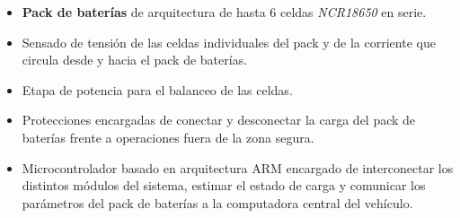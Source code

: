 \documentclass[10pt,a4paper]{article}
\begin{document}
\begin{itemize}
	\item \textbf{Pack de baterías} de arquitectura de hasta 6 celdas \emph{NCR18650} en serie.
	\item Sensado de tensión de las celdas individuales del pack y de la corriente que circula desde y hacia el pack de baterías.
	\item Etapa de potencia para el balanceo de las celdas.
	\item Protecciones encargadas de conectar y desconectar la carga del pack de baterías frente a operaciones fuera de la zona segura. 
	\item Microcontrolador basado en arquitectura ARM encargado de interconectar los distintos módulos del sistema, estimar el estado de carga y comunicar los parámetros del pack de baterías a la computadora central del vehículo.
\end{itemize}

\clearpage
\end{document}
